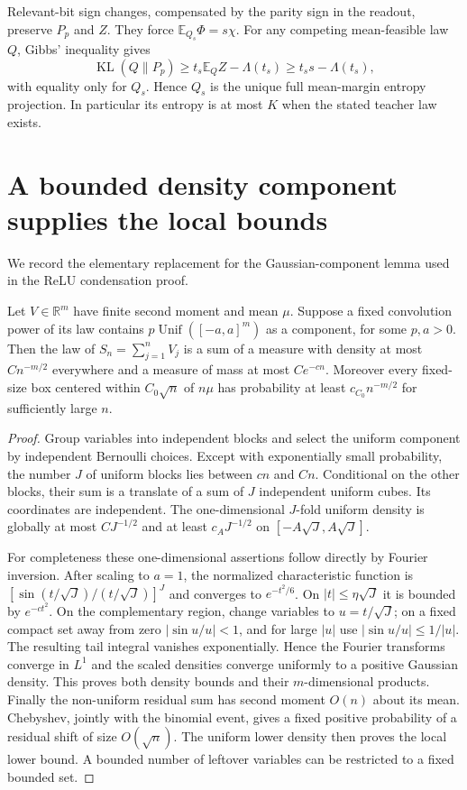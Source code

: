 \documentclass[11pt]{article}
\newcommand{\E}{\mathbb E}\newcommand{\Pp}{\mathbb P}
\newcommand{\R}{\mathbb R}\newcommand{\relu}{\operatorname{ReLU}}
\begin{document}
Relevant-bit sign changes, compensated by the parity sign in the readout,
preserve $P_p$ and $Z$. They force $\E_{Q_s}\Phi=s\chi$.
For any competing mean-feasible law $Q$, Gibbs' inequality gives
\[
 \operatorname{KL}(Q\|P_p)
 \ge t_s\E_QZ-\Lambda(t_s)\ge t_ss-\Lambda(t_s),
\]
with equality only for $Q_s$. Hence $Q_s$ is the unique full
mean-margin entropy projection. In particular its entropy is at most $K$
when the stated teacher law exists.

\section{A bounded density component supplies the local bounds}
We record the elementary replacement for the Gaussian-component lemma
used in the ReLU condensation proof.

\begin{lemma}
Let $V\in\R^m$ have finite second moment and mean $\mu$. Suppose a fixed
convolution power of its law contains $p\operatorname{Unif}([-a,a]^m)$
as a component, for some $p,a>0$. Then the law of $S_n=\sum_{j=1}^nV_j$
is a sum of a measure with density at most $Cn^{-m/2}$ everywhere and a
measure of mass at most $Ce^{-cn}$. Moreover every fixed-size box
centered within $C_0\sqrt n$ of $n\mu$ has probability at least
$c_{C_0}n^{-m/2}$ for sufficiently large $n$.
\end{lemma}
\begin{proof}
Group variables into independent blocks and select the uniform component
by independent Bernoulli choices. Except with exponentially small
probability, the number $J$ of uniform blocks lies between $c n$ and $C n$.
Conditional on the other blocks, their sum is a translate of a sum of
$J$ independent uniform cubes. Its coordinates are independent.
The one-dimensional $J$-fold uniform density is globally at most
$C J^{-1/2}$ and at least $c_A J^{-1/2}$ on $[-A\sqrt J,A\sqrt J]$.

For completeness these one-dimensional assertions follow directly by
Fourier inversion. After scaling to $a=1$, the normalized characteristic
function is $[\sin(t/\sqrt J)/(t/\sqrt J)]^J$ and converges to
$e^{-t^2/6}$. On $|t|\le\eta\sqrt J$ it is bounded by $e^{-c t^2}$.
On the complementary region, change variables to $u=t/\sqrt J$;
on a fixed compact set away from zero $|\sin u/u|<1$, and for large
$|u|$ use $|\sin u/u|\le1/|u|$. The resulting tail integral vanishes
exponentially. Hence the Fourier transforms converge in $L^1$ and the
scaled densities converge uniformly to a positive Gaussian density.
This proves both density bounds and their $m$-dimensional products.
Finally the non-uniform residual sum has second moment $O(n)$ about
its mean. Chebyshev, jointly with the binomial event, gives a fixed
positive probability of a residual shift of size $O(\sqrt n)$.
The uniform lower density then proves the local lower bound. A bounded
number of leftover variables can be restricted to a fixed bounded set.
\end{proof}
\end{document}
